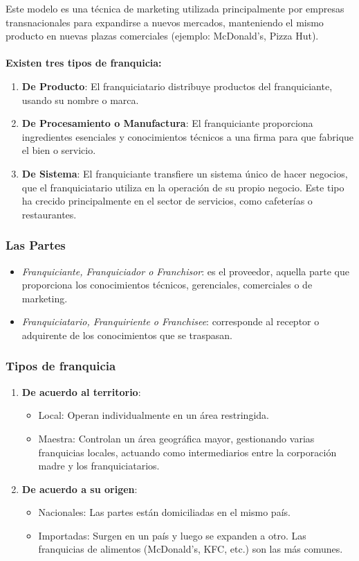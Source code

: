 \documentclass{templateNote}
\begin{document}
Este modelo es una técnica de marketing utilizada principalmente por empresas transnacionales para expandirse a nuevos mercados, manteniendo el mismo producto en nuevas plazas comerciales (ejemplo: McDonald's, Pizza Hut).
\\\\
\noindent\textbf{Existen tres tipos de franquicia:}
\begin{enumerate}
    \item \textbf{De Producto}: El franquiciatario distribuye productos del franquiciante, usando su nombre o marca.
    \item \textbf{De Procesamiento o Manufactura}: El franquiciante proporciona ingredientes esenciales y conocimientos técnicos a una firma para que fabrique el bien o servicio.
    \item \textbf{De Sistema}: El franquiciante transfiere un sistema único de hacer negocios, que el franquiciatario utiliza en la operación de su propio negocio. Este tipo ha crecido principalmente en el sector de servicios, como cafeterías o restaurantes.
\end{enumerate}

\subsubsection*{Las Partes}
\begin{itemize}
    \item \textit{Franquiciante, Franquiciador o Franchisor}: es el proveedor, aquella parte que proporciona los conocimientos técnicos, gerenciales, comerciales o de marketing.
    \item \textit{Franquiciatario, Franquiriente o Franchisee}: corresponde al receptor o adquirente de los conocimientos que se traspasan.
\end{itemize}

\subsubsection*{Tipos de franquicia}
\begin{enumerate}
    \item \textbf{De acuerdo al territorio}:
    \begin{itemize}
        \item Local: Operan individualmente en un área restringida.
        \item Maestra: Controlan un área geográfica mayor, gestionando varias franquicias locales, actuando como intermediarios entre la corporación madre y los franquiciatarios.
    \end{itemize}
    \item \textbf{De acuerdo a su origen}:
    \begin{itemize}
        \item Nacionales: Las partes están domiciliadas en el mismo país.
        \item Importadas: Surgen en un país y luego se expanden a otro. Las franquicias de alimentos (McDonald’s, KFC, etc.) son las más comunes.
    \end{itemize}
\end{enumerate}
\end{document}
